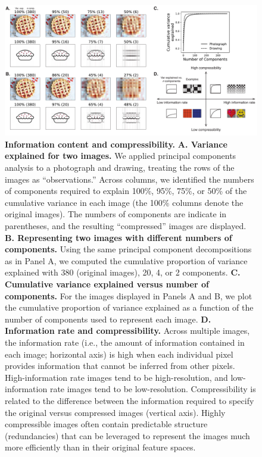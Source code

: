 \documentclass[english, 11pt]{article}
\begin{document}
\begin{figure}[tp]

  \centering
  \includegraphics[width=\textwidth]{figs/information_and_compressibility}
  
  \caption{\textbf{Information content and compressibility.} \textbf{A.
  Variance explained for two images.} We applied principal components analysis
  to a photograph and drawing, treating the rows of the images as
  ``observations.'' Across columns, we identified the numbers of components
  required to explain 100\%, 95\%, 75\%, or 50\% of the cumulative variance in
  each image (the 100\% columns denote the original images). The numbers of
  components are indicate in parentheses, and the resulting ``compressed''
  images are displayed. \textbf{B. Representing two images with different
  numbers of components.} Using the same principal component decompositions as
  in Panel A, we computed the cumulative proportion of variance explained with
  380 (original images), 20, 4, or 2 components. \textbf{C. Cumulative variance
  explained versus number of components.} For the images displayed in Panels A
  and B, we plot the cumulative proportion of variance explained as a function
  of the number of components used to represent each image. \textbf{D.
  Information rate and compressibility.} Across multiple images, the
  information rate (i.e., the amount of information contained in each image;
  horizontal axis) is high when each individual pixel provides information that
  cannot be inferred from other pixels. High-information rate images tend to be
  high-resolution, and low-information rate images tend to be low-resolution.
  Compressibility is related to the difference between the information required
  to specify the original versus compressed images (vertical axis). Highly
  compressible images often contain predictable structure (redundancies) that
  can be leveraged to represent the images much more efficiently than in their
  original feature spaces.}

\label{fig:information-compression} 
\end{figure}
\end{document}
